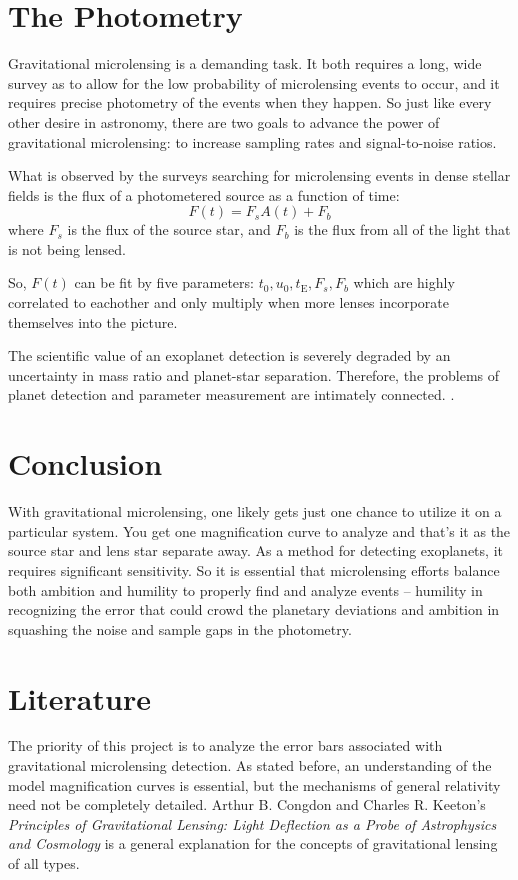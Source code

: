 \documentclass[12pt, a4paper, twocolumn]{article}
\begin{document}
\section{The Photometry}

Gravitational microlensing is a demanding task. It both requires a long, wide survey as to allow for the low probability of microlensing events to occur, and it requires precise photometry of the events when they happen. So just like every other desire in astronomy, there are two goals to advance the power of gravitational microlensing: to increase sampling rates and signal-to-noise ratios.

What is observed by the surveys searching for microlensing events in dense stellar fields is the flux of a photometered source as a function of time:
\[F(t)=F_sA(t)+F_b\]
where $F_s$ is the flux of the source star, and $F_b$ is the flux from all of the light that is not being lensed.

So, $F(t)$ can be fit by five parameters: $t_0,u_0,t_\mathrm E,F_s,F_b$ which are highly correlated to eachother and only multiply when more lenses incorporate themselves into the picture.

The scientific value of an exoplanet detection is severely degraded by an uncertainty in mass ratio and planet-star separation. Therefore, the problems of planet detection and parameter measurement are intimately connected. \cite{gaudi_parameters}.

\section{Conclusion}

With gravitational microlensing, one likely gets just one chance to utilize it on a particular system. You get one magnification curve to analyze and that's it as the source star and lens star separate away. As a method for detecting exoplanets, it requires significant sensitivity. So it is essential that microlensing efforts balance both ambition and humility to properly find and analyze events
-- humility in recognizing the error that could crowd the planetary deviations and ambition in squashing the noise and sample gaps in the photometry.

\section{Literature}

The priority of this project is to analyze the error bars associated with gravitational microlensing detection.
As stated before, an understanding of the model magnification curves is essential, but the mechanisms of general relativity need not be completely detailed.
Arthur B. Congdon and Charles R. Keeton's \emph{Principles of Gravitational Lensing: Light Deflection as a Probe of Astrophysics and Cosmology} \cite{gl_princ} is a general explanation for the concepts of gravitational lensing of all types.
\end{document}
